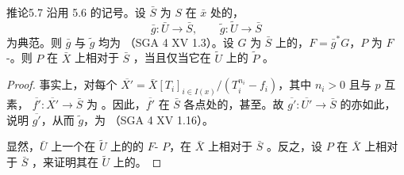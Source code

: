 \begin{SGAresult}{推论}{5.7}
沿用 5.6 的记号。设 $\bar S$ 为 $S$ 在 $\bar x$ 处的，
\[\bar g:\bar U\longrightarrow\bar S,\qquad\widetilde g:\widetilde U\longrightarrow\bar S\]
为典范。则 $\bar g$ 与 $\widetilde g$ 均为 （SGA 4 XV 1.3）。设 $G$ 为 $\bar S$ 上的，$F=\bar g^*G$，$P$ 为 $F$-。则 $P$ 在 $\bar X$ 上相对于 $\bar S$ ，当且仅当它在 $\widetilde U$ 上的 $\widetilde P$ 。
\end{SGAresult}
\begin{proof}
事实上，对每个 $\overline{X'}=\bar X[T_i]_{i\in I(x)}/(T_i^{n_i}-f_i)$，其中 $n_i>0$ 且与 $p$ 互素， $\overline{f'}:\overline{X'}\to\bar S$ 为 。因此，$\overline{f'}$ 在 $\bar S$ 各点处的，甚至。故 $\overline{g'}:\overline{U'}\to\bar S$ 的亦如此，说明 $\overline{g'}$，从而 $\widetilde g$，为 （SGA 4 XV 1.16）。

显然，$\bar U$ 上一个在 $\widetilde U$ 上的的 $F$- $P$，在 $\bar X$ 上相对于 $\bar S$ 。反之，设 $P$ 在 $\bar X$ 上相对于 $\bar S$ ，来证明其在 $\widetilde U$ 上的。


\end{proof}
